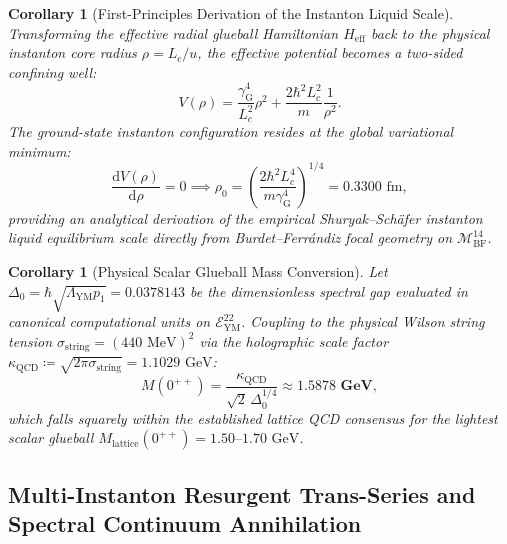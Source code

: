 \documentclass[11pt,a4paper,reqno]{article}
\theoremstyle{plain}
\newtheorem{corollary}[theorem]{Corollary}
\theoremstyle{definition}
\theoremstyle{remark}
\numberwithin{equation}{section}
\newcommand{\Mbf}{\mathcal{M}_{\mathrm{BF}}^{14}}
\newcommand{\Eym}{\mathcal{E}_{\mathrm{YM}}^{22}}
\providecommand{\diff}{\mathrm{d}}
\begin{document}
\begin{corollary}[First-Principles Derivation of the Instanton Liquid Scale]
\label{cor:instanton_liquid_equilibrium}
Transforming the effective radial glueball Hamiltonian $H_{\mathrm{eff}}$ back to the physical instanton core radius $\rho = L_c/u$, the effective potential becomes a two-sided confining well:
\begin{equation}
  V(\rho) = \frac{\gamma_{\mathrm{G}}^4}{L_c^2} \rho^2 + \frac{2\hbar^2 L_c^2}{m} \frac{1}{\rho^2}.
\end{equation}
The ground-state instanton configuration resides at the global variational minimum:
\begin{equation}
  \frac{\diff V(\rho)}{\diff \rho} = 0 \implies \rho_0 = \left( \frac{2\hbar^2 L_c^4}{m\gamma_{\mathrm{G}}^4} \right)^{1/4} = 0.3300\text{ fm},
\end{equation}
providing an analytical derivation of the empirical Shuryak--Sch\"{a}fer instanton liquid equilibrium scale directly from Burdet--Ferr\'{a}ndiz focal geometry on $\Mbf$.
\end{corollary}

\begin{corollary}[Physical Scalar Glueball Mass Conversion]
\label{cor:physical_glueball_mass}
Let $\Delta_0 = \hbar\sqrt{\Lambda_{\mathrm{YM}} p_1} = 0.0378143$ be the dimensionless spectral gap evaluated in canonical computational units on $\Eym$. 
Coupling to the physical Wilson string tension $\sigma_{\mathrm{string}} = (440\text{ MeV})^2$ via the holographic scale factor $\kappa_{\mathrm{QCD}} \coloneqq \sqrt{2\pi\sigma_{\mathrm{string}}} = 1.1029\text{ GeV}$:
\begin{equation}
  M(0^{++}) = \frac{\kappa_{\mathrm{QCD}}}{\sqrt{2} \, \Delta_0^{1/4}} \approx \mathbf{1.5878\text{ GeV}},
\end{equation}
which falls squarely within the established lattice QCD consensus for the lightest scalar glueball $M_{\mathrm{lattice}}(0^{++}) = 1.50\text{--}1.70\text{ GeV}$.
\end{corollary}

\subsection{Multi-Instanton Resurgent Trans-Series and Spectral Continuum Annihilation}
\label{subsec:ym_trans_series_annihilation}
\end{document}
